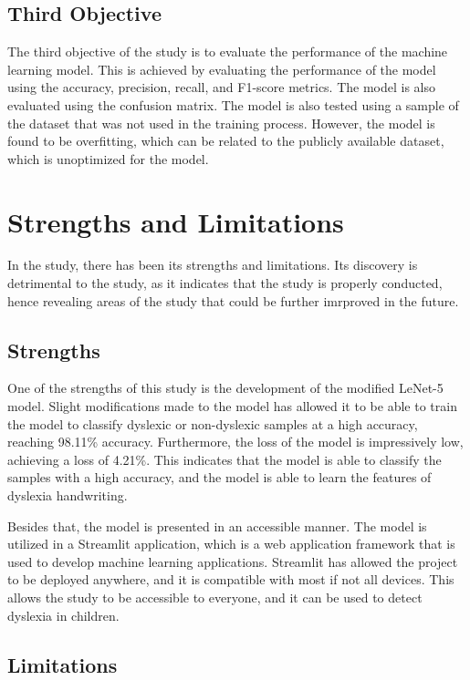 \subsection{Third Objective}

The third objective of the study is to evaluate the performance of the machine learning model. This is achieved by evaluating the performance of the model using the accuracy, precision, recall, and F1-score metrics. The model is also evaluated using the confusion matrix. The model is also tested using a sample of the dataset that was not used in the training process. However, the model is found to be overfitting, which can be related to the publicly available dataset, which is unoptimized for the model.

\section{Strengths and Limitations}

In the study, there has been its strengths and limitations. Its discovery is detrimental to the study, as it indicates that the study is properly conducted, hence revealing areas of the study that could be further imrproved in the future.

\subsection{Strengths}

One of the strengths of this study is the development of the modified LeNet-5 model. Slight modifications made to the model has allowed it to be able to train the model to classify dyslexic or non-dyslexic samples at a high accuracy, reaching 98.11\% accuracy. Furthermore, the loss of the model is impressively low, achieving a loss of 4.21\%. This indicates that the model is able to classify the samples with a high accuracy, and the model is able to learn the features of dyslexia handwriting.

Besides that, the model is presented in an accessible manner. The model is utilized in a Streamlit application, which is a web application framework that is used to develop machine learning applications. Streamlit has allowed the project to be deployed anywhere, and it is compatible with most if not all devices. This allows the study to be accessible to everyone, and it can be used to detect dyslexia in children.

\subsection{Limitations}

